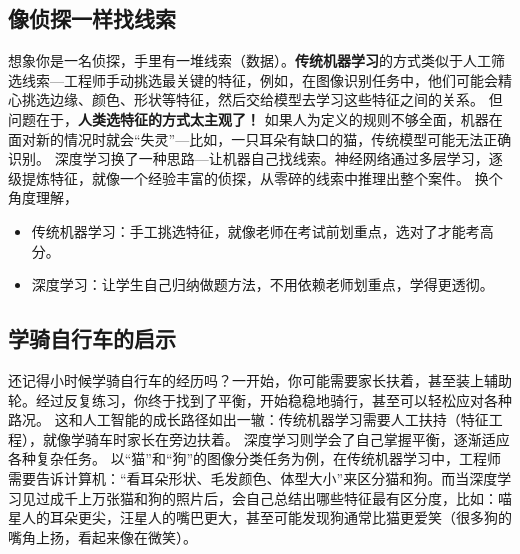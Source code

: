 
\subsection{像侦探一样找线索}


想象你是一名侦探，手里有一堆线索（数据）。\textbf{传统机器学习}的方式类似于人工筛选线索---工程师手动挑选最关键的特征，例如，在图像识别任务中，他们可能会精心挑选边缘、颜色、形状等特征，然后交给模型去学习这些特征之间的关系。
但问题在于，{\bf 人类选特征的方式太主观了！} 如果人为定义的规则不够全面，机器在面对新的情况时就会“失灵”---比如，一只耳朵有缺口的猫，传统模型可能无法正确识别。
深度学习换了一种思路---让机器自己找线索。神经网络通过多层学习，逐级提炼特征，就像一个经验丰富的侦探，从零碎的线索中推理出整个案件。
换个角度理解，
\begin{itemize}
    \item 传统机器学习：手工挑选特征，就像老师在考试前划重点，选对了才能考高分。
    \item 深度学习：让学生自己归纳做题方法，不用依赖老师划重点，学得更透彻。
\end{itemize}
\subsection{学骑自行车的启示}


还记得小时候学骑自行车的经历吗？一开始，你可能需要家长扶着，甚至装上辅助轮。经过反复练习，你终于找到了平衡，开始稳稳地骑行，甚至可以轻松应对各种路况。
这和人工智能的成长路径如出一辙：传统机器学习需要人工扶持（特征工程），就像学骑车时家长在旁边扶着。
深度学习则学会了自己掌握平衡，逐渐适应各种复杂任务。
以“猫”和“狗”的图像分类任务为例，在传统机器学习中，工程师需要告诉计算机：“看耳朵形状、毛发颜色、体型大小”来区分猫和狗。而当深度学习见过成千上万张猫和狗的照片后，会自己总结出哪些特征最有区分度，比如：喵星人的耳朵更尖，汪星人的嘴巴更大，甚至可能发现狗通常比猫更爱笑（很多狗的嘴角上扬，看起来像在微笑）。
